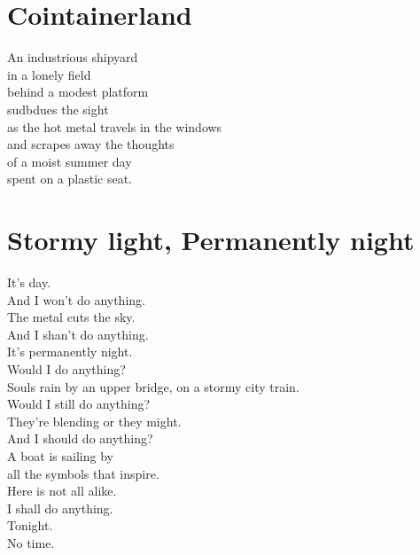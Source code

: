 \documentclass[a4paper,twoside, openany]{book}
\newenvironment{Verse}
  {\center\varwidth{\linewidth}\fontsize{18}{21.6}\selectfont}
  {\endvarwidth\endcenter}
\begin{document}
\chapter{Cointainerland}
\begin{Verse}
An industrious shipyard\\
in a lonely field\\
behind a modest platform\\
sudbdues the sight\\
as the hot metal travels in the windows\\
and scrapes away the thoughts\\
of a moist summer day\\
spent on a plastic seat.
\end{Verse}
\chapter{Stormy light, Permanently night}
\begin{Verse}
It's day.\\
And I won't do anything.\\
The metal cuts the sky.\\
And I shan't do anything.\\
It's  permanently night.\\
Would I do anything?\\
Souls rain by an upper bridge, on a stormy city train.\\
Would I still do anything?\\
They're blending or they might.\\
And I should do anything?\\
A boat is sailing by\\
all the symbols that inspire.\\
Here is not all alike.\\
I shall do anything.\\
Tonight.\\
No time.
\end{Verse}
\end{document}
